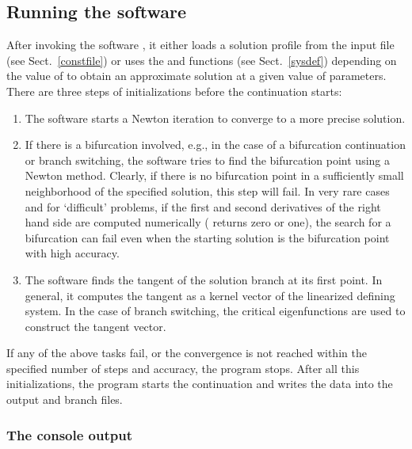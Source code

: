 \documentclass[10pt,a4paper]{ddedoc}
\begin{document}
\subsection{Running the software}

After invoking the software , it either loads a solution profile
from the input file (see Sect.\ \ref{constfile}) or uses the 
 and  functions (see Sect.\ \ref{sysdef})
depending on the value of  to obtain an approximate solution at a
given value of parameters. There are three steps of initializations before the
continuation starts:
\begin{enumerate}
\item The software starts a Newton iteration to converge to a more precise
solution.
\item If there is a bifurcation involved, e.g., in the case of a bifurcation
continuation or branch switching, the software tries to find the bifurcation
point using a Newton method. Clearly, if there is no bifurcation point in a
sufficiently small neighborhood of the specified solution, this step will fail.
In very rare cases and for `difficult' problems, if the first and second
derivatives of the right hand side are computed numerically (
returns zero or one), the search for a bifurcation can fail even when the
starting solution is the bifurcation point with high accuracy.
\item The software finds the tangent of the solution branch at its first point. In
general, it computes the tangent as a kernel vector of the linearized defining
system. In the case of branch switching, the critical eigenfunctions are used to
construct the tangent vector.
\end{enumerate}
If any of the above tasks fail, or the convergence is not reached within the
specified number of steps and accuracy, the program stops.
After all this initializations, the program starts the continuation and writes
the data into the output and branch files.

\subsubsection{The console output}
\end{document}
